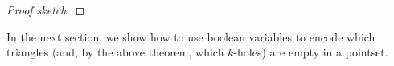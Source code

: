 \begin{proof}[Proof sketch]
\end{proof}

In the next section,
we show how to use boolean variables to encode which triangles (and, by the above theorem, which $k$-holes) are empty in a pointset.